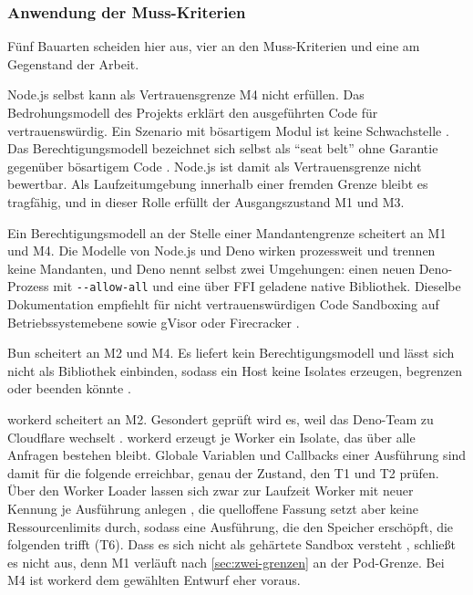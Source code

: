 \subsubsection{Anwendung der Muss-Kriterien}
\label{sec:ausschluesse}

Fünf Bauarten scheiden hier aus, vier an den Muss-Kriterien und eine am Gegenstand der Arbeit.

Node.js selbst kann als Vertrauensgrenze M4 nicht erfüllen. Das Bedrohungsmodell des Projekts erklärt den
ausgeführten Code für vertrauenswürdig. Ein Szenario mit bösartigem Modul ist keine Schwachstelle
\autocite{the_nodejs_project_security_2026}. Das Berechtigungsmodell bezeichnet sich selbst als
\enquote{seat belt} ohne Garantie gegenüber bösartigem Code \autocite{the_nodejs_project_permissions_2026}. Node.js
ist damit als Vertrauensgrenze nicht bewertbar. Als Laufzeitumgebung innerhalb einer fremden Grenze bleibt es
tragfähig, und in dieser Rolle erfüllt der Ausgangszustand M1 und M3.

Ein Berechtigungsmodell an der Stelle einer Mandantengrenze scheitert an M1 und M4. Die Modelle von Node.js und Deno
wirken prozessweit und trennen keine Mandanten, und Deno nennt selbst zwei Umgehungen: einen neuen Deno-Prozess mit
\texttt{-\kern0pt-allow-all} und eine über \ac{FFI} geladene native Bibliothek. Dieselbe Dokumentation empfiehlt für
nicht vertrauenswürdigen Code Sandboxing auf Betriebssystemebene sowie gVisor oder Firecracker
\autocite{the_deno_authors_security_2026}.

Bun scheitert an M2 und M4. Es liefert kein Berechtigungsmodell \autocite{oven-shbun_contributors_bun_2026} und lässt
sich nicht als Bibliothek einbinden, sodass ein Host keine Isolates erzeugen, begrenzen oder beenden könnte
\autocite{oven-shbun_contributors_feature_2026}.

workerd scheitert an M2. Gesondert geprüft wird es, weil das Deno-Team zu Cloudflare wechselt
\autocite{noauthor_deno_2026}. workerd erzeugt je Worker ein Isolate, das über alle Anfragen bestehen bleibt.
Globale Variablen und Callbacks einer Ausführung sind damit für die folgende erreichbar, genau der Zustand, den T1 und T2
prüfen. Über den Worker Loader lassen sich zwar zur Laufzeit Worker mit neuer Kennung je Ausführung anlegen
\autocite{cloudflare_worker_2026}, die quelloffene Fassung setzt aber keine Ressourcenlimits durch, sodass eine
Ausführung, die den Speicher erschöpft, die folgenden trifft (T6). Dass es sich nicht als gehärtete Sandbox
versteht \autocite{cloudflare_workerd_2026}, schließt es nicht aus, denn M1 verläuft nach \autoref{sec:zwei-grenzen} an
der Pod-Grenze. Bei M4 ist workerd dem gewählten Entwurf eher voraus.

